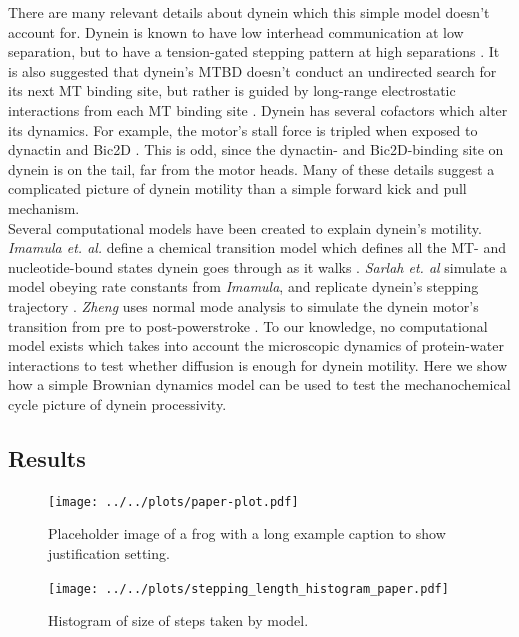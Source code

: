 \documentclass[9pt,twocolumn,twoside,lineno]{pnas-new}
\begin{document}
There are many relevant details about dynein which this simple model doesn't account for. Dynein is known to have low interhead communication at low separation, but to have a tension-gated stepping pattern at high separations \cite{yildizpaper}. It is also suggested that dynein's MTBD doesn't conduct an undirected search for its next MT binding site, but rather is guided by long-range electrostatic interactions from each MT binding site \cite{longrangemt}. Dynein has several cofactors which alter its dynamics. For example, the motor's stall force is tripled when exposed to dynactin and Bic2D \cite{yildizdynactin}. This is odd, since the dynactin- and Bic2D-binding site on dynein is on the tail, far from the motor heads. Many of these details suggest a complicated picture of dynein motility than a simple forward kick and pull mechanism.\\

Several computational models have been created to explain dynein's motility. \textit{Imamula et. al.} define a chemical transition model which defines all the MT- and nucleotide-bound states dynein goes through as it walks \cite{imamulamodel}. \textit{Sarlah et. al} simulate a model obeying rate constants from \textit{Imamula}, and replicate dynein's stepping trajectory \cite{sarlahmodel}. \textit{Zheng} uses normal mode analysis to simulate the dynein motor's transition from pre to post-powerstroke \cite{normalmodes}. To our knowledge, no computational model exists which takes into account the microscopic dynamics of protein-water interactions to test whether diffusion is enough for dynein motility. Here we show how a simple Brownian dynamics model can be used to test the mechanochemical cycle picture of dynein processivity.\\

\subsection*{Results}

\begin{figure}%
\centering
\texttt{[image: ../../plots/paper-plot.pdf]}
\caption{Placeholder image of a frog with a long example caption to show justification setting.}
\label{fig:trajectory}
\end{figure}

\begin{figure}%
\centering
\texttt{[image: ../../plots/stepping\_length\_histogram\_paper.pdf]}
\caption{Histogram of size of steps taken by model.}
\label{fig:lengthhist}
\end{figure}
\end{document}

